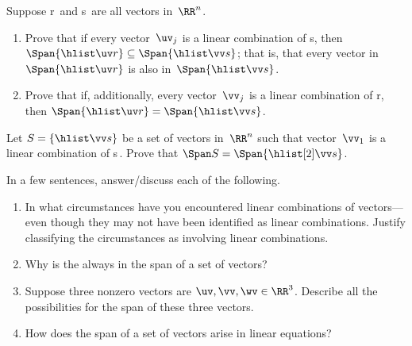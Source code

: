 \begin{exercise}  
Suppose \hlist\uv r\ and \hlist\vv s\ are all vectors in~\(\RR^n\).
\begin{enumerate}
\item Prove that if every vector~\(\uv_j\) is a linear combination of \hlist\vv s, then \(\Span\{\hlist\uv r\}\subseteq\Span\{\hlist\vv s\}\); that is, that every vector in~\(\Span\{\hlist\uv r\}\) is also in~\(\Span\{\hlist\vv s\}\).
\item  Prove that if, additionally, every vector~\(\vv_j\) is a linear combination of \hlist\uv r, then \(\Span\{\hlist\uv r\}=\Span\{\hlist\vv s\}\).
\end{enumerate}
\end{exercise}





\begin{exercise}  
Let \(S=\{\hlist\vv s\}\) be a set of vectors in~\(\RR^n\) such that vector~\(\vv_1\) is a linear combination of \hlist[2]\vv s\,.  
Prove that \(\Span S=\Span\{\hlist[2]\vv s\}\).
\end{exercise}







\begin{exercise}  
In a few sentences, answer\slash discuss each of the following.
\begin{enumerate}
\item In what circumstances have you encountered linear combinations of vectors---even though they may not have been identified as linear combinations.
Justify classifying the circumstances as involving linear combinations. 


\item Why is the  always in the span of a set of vectors?

\item Suppose three nonzero vectors are \(\uv,\vv,\wv\in\RR^3\).  
Describe all the possibilities for the span of these three vectors.

\item How does the span of a set of vectors arise in linear equations?

\end{enumerate}
\end{exercise}

\begin{comment}%
why, what caused X?
how did X occur?
what-if? what-if-not?
how does X compare with Y?
what is the evidence for X?
why is X important?
\end{comment}


